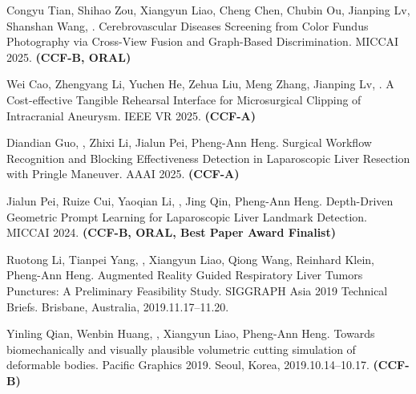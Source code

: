 \documentclass[a4paper,12pt,english]{curve}
\begin{document}
\begin{small}
\begin{publist}
\item Congyu Tian, Shihao Zou, Xiangyun Liao, Cheng Chen, Chubin Ou, Jianping Lv, Shanshan Wang, \WS\CORR. Cerebrovascular Diseases Screening from Color Fundus Photography via Cross-View Fusion and Graph-Based Discrimination. MICCAI 2025. \textbf{(CCF-B, ORAL)}
\item Wei Cao, Zhengyang Li, Yuchen He, Zehua Liu, Meng Zhang, Jianping Lv, \WS\CORR. A Cost-effective Tangible Rehearsal Interface for Microsurgical Clipping of Intracranial Aneurysm. IEEE VR 2025. \textbf{(CCF-A)}
\item Diandian Guo\COF, \WS\COF, Zhixi Li, Jialun Pei\CORR, Pheng-Ann Heng. Surgical Workflow Recognition and Blocking Effectiveness Detection in Laparoscopic Liver Resection with Pringle Maneuver. AAAI 2025. \textbf{(CCF-A)}
\item Jialun Pei, Ruize Cui, Yaoqian Li, \WS\CORR, Jing Qin, Pheng-Ann Heng. Depth-Driven Geometric Prompt Learning for Laparoscopic Liver Landmark Detection. MICCAI 2024. \textbf{(CCF-B, ORAL, Best Paper Award Finalist)}
\item Ruotong Li, Tianpei Yang, \WS\CORR, Xiangyun Liao, Qiong Wang, Reinhard Klein, Pheng-Ann Heng. Augmented Reality Guided Respiratory Liver Tumors Punctures: A Preliminary Feasibility Study. SIGGRAPH Asia 2019 Technical Briefs. Brisbane, Australia, 2019.11.17--11.20.
\item Yinling Qian, Wenbin Huang, \WS\CORR, Xiangyun Liao, Pheng-Ann Heng. Towards biomechanically and visually plausible volumetric cutting simulation of deformable bodies. Pacific Graphics 2019. Seoul, Korea, 2019.10.14--10.17. \textbf{(CCF-B)}
\end{publist}
\end{small}
\end{document}
